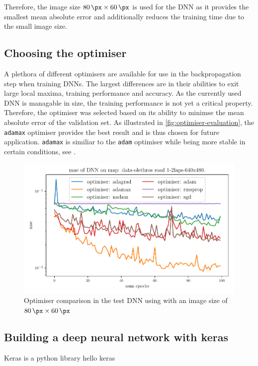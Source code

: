 \documentclass[10pt,a4paper,twoside,journal]{IEEEtran}
\begin{document}
Therefore, the image size $ \SI{80}{\px}\times\SI{60}{\px} $ is used for the DNN as it provides the smallest mean absolute error and additionally reduces the training time due to the small image size.

\subsection{Choosing the optimiser}
\label{sc:optimiser-choice}
A plethora of different optimisers are available for use in the backpropagation step when training DNNs. The largest differences are in their abilities to exit large local maxima, training performance and accuracy. As the currently used DNN is managable in size, the training performance is not yet a critical property. Therefore, the optimiser was selected based on its ability to minimse the mean absolute error of the validation set. As illustrated in \autoref{fig:optimiser-evaluation}, the \texttt{adamax} optimiser provides the best result and is thus chosen for future application. \texttt{adamax} is similiar to the \texttt{adam} optimiser while being more stable in certain conditions, see \cite{DBLP:journals/corr/KingmaB14}. 

\begin{figure}[ht]
	\centering
	\includegraphics[width=\columnwidth]{attachments/alexnet-val_mae-optimiser_comp-69975-70890-71951-76023-79233-82251.pdf}
	\caption{Optimiser comparison in the test DNN using with an image size of $ \SI{80}{\px}\times\SI{60}{\px} $}
	\label{fig:optimiser-evaluation}
\end{figure}

\subsection{Building a deep neural network with keras}
\label{ssc:keras}
Keras is a python library 
hello keras \cite{Toshev_2014_CVPR}
\end{document}
